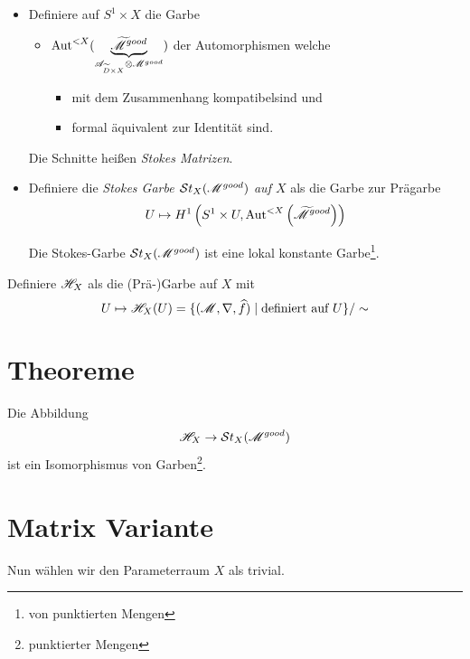 \begin{defn}
  \begin{itemize}
    \item 
      Definiere auf $S^1\times X$ die Garbe
      \begin{itemize}
        \item $\operatorname{Aut}^{<X}(
          \underset{\mathscr{A}_{\widetilde D\times X}\otimes\mathscr{M}^{good}}
          {\underbrace{\widetilde{\mathscr{M}}^{good}}})$ der Automorphismen
          welche
          \begin{itemize}
            \item mit dem Zusammenhang kompatibel\TODO[in Formeln] sind und
            \item formal äquivalent zur Identität sind.
          \end{itemize}
      \end{itemize}
      Die Schnitte heißen \emph{Stokes Matrizen}.
    \item Definiere die \emph{Stokes Garbe $\mathcal{S}{}t_X(\mathscr{M}^{good})$ auf $X$} als die
    Garbe zur Prägarbe
    \[
      U\mapsto H^1\left(S^1\times U,\operatorname{Aut}^{<X}\left(\widetilde {\mathscr{M}}^{good}\right)\right)
    \]
    \begin{thm}
      Die Stokes-Garbe $\mathcal{S}{}t_X(\mathscr{M}^{good})$ ist eine lokal konstante
      Garbe\footnote{von punktierten Mengen}.
    \end{thm}
  \end{itemize}
\end{defn}

Definiere $\mathscr{H}_X$ als die (Prä-)Garbe auf $X$ mit
\[
  U\mapsto\mathscr{H}_X(U)=\{(\mathscr{M},\nabla,\widehat f) \mid \text{definiert auf $U$}\} /\sim
\]

\TODO[Morphism $\sH_X\to\St_X(\sM^{good})$]
\section{Theoreme} %
\begin{thm}
  Die Abbildung
  \[
    \mathscr{H}_X\to\mathcal{S}{}t_X(\mathscr{M}^{good})
  \]
  ist ein Isomorphismus von Garben\footnote{punktierter Mengen}.
\end{thm}

\section{Matrix Variante}
Nun wählen wir den Parameterraum $X$ als trivial.
\begin{comment}
  Sei $x^0\in X$ dann $\sH_{X,x_0}=\cH(A^0)$ für passendes $A^0$.
\end{comment}


